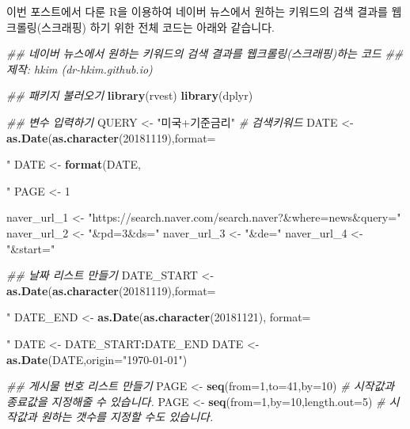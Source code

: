 \documentclass[]{article}
\newenvironment{Shaded}{\begin{snugshade}}{\end{snugshade}}
\newcommand{\CommentTok}[1]{\textcolor[rgb]{0.56,0.35,0.01}{\textit{#1}}}
\newcommand{\DataTypeTok}[1]{\textcolor[rgb]{0.13,0.29,0.53}{#1}}
\newcommand{\DecValTok}[1]{\textcolor[rgb]{0.00,0.00,0.81}{#1}}
\newcommand{\KeywordTok}[1]{\textcolor[rgb]{0.13,0.29,0.53}{\textbf{#1}}}
\newcommand{\NormalTok}[1]{#1}
\newcommand{\OperatorTok}[1]{\textcolor[rgb]{0.81,0.36,0.00}{\textbf{#1}}}
\newcommand{\StringTok}[1]{\textcolor[rgb]{0.31,0.60,0.02}{#1}}
\begin{document}
이번 포스트에서 다룬 R을 이용하여 네이버 뉴스에서 원하는 키워드의 검색
결과를 웹크롤링(스크래핑) 하기 위한 전체 코드는 아래와 같습니다.

\begin{Shaded}
\begin{Highlighting}[]
\CommentTok{## 네이버 뉴스에서 원하는 키워드의 검색 결과를 웹크롤링(스크래핑)하는 코드}
\CommentTok{## 제작: hkim (dr-hkim.github.io)}

\CommentTok{## 패키지 불러오기}
\KeywordTok{library}\NormalTok{(rvest)}
\KeywordTok{library}\NormalTok{(dplyr)}

\CommentTok{## 변수 입력하기}
\NormalTok{QUERY <-}\StringTok{ "미국+기준금리"} \CommentTok{# 검색키워드}
\NormalTok{DATE  <-}\StringTok{ }\KeywordTok{as.Date}\NormalTok{(}\KeywordTok{as.character}\NormalTok{(}\DecValTok{20181119}\NormalTok{),}\DataTypeTok{format=}\StringTok{"%Y%m%d"}\NormalTok{) }\CommentTok{# 검색시작날짜 & 검색종료날짜}
\NormalTok{DATE <-}\StringTok{ }\KeywordTok{format}\NormalTok{(DATE, }\StringTok{"%Y.%m.%d"}\NormalTok{)}
\NormalTok{PAGE  <-}\StringTok{ }\DecValTok{1}

\NormalTok{naver_url_}\DecValTok{1}\NormalTok{ <-}\StringTok{ "https://search.naver.com/search.naver?&where=news&query="}
\NormalTok{naver_url_}\DecValTok{2}\NormalTok{ <-}\StringTok{ "&pd=3&ds="}
\NormalTok{naver_url_}\DecValTok{3}\NormalTok{ <-}\StringTok{ "&de="}
\NormalTok{naver_url_}\DecValTok{4}\NormalTok{ <-}\StringTok{ "&start="}

\CommentTok{## 날짜 리스트 만들기}
\NormalTok{DATE_START <-}\StringTok{ }\KeywordTok{as.Date}\NormalTok{(}\KeywordTok{as.character}\NormalTok{(}\DecValTok{20181119}\NormalTok{),}\DataTypeTok{format=}\StringTok{"%Y%m%d"}\NormalTok{) }\CommentTok{# 시작일자}
\NormalTok{DATE_END   <-}\StringTok{ }\KeywordTok{as.Date}\NormalTok{(}\KeywordTok{as.character}\NormalTok{(}\DecValTok{20181121}\NormalTok{),  }\DataTypeTok{format=}\StringTok{"%Y%m%d"}\NormalTok{) }\CommentTok{# 종료일자}
\NormalTok{DATE <-}\StringTok{ }\NormalTok{DATE_START}\OperatorTok{:}\NormalTok{DATE_END}
\NormalTok{DATE <-}\StringTok{ }\KeywordTok{as.Date}\NormalTok{(DATE,}\DataTypeTok{origin=}\StringTok{"1970-01-01"}\NormalTok{)}

\CommentTok{## 게시물 번호 리스트 만들기}
\NormalTok{PAGE <-}\StringTok{ }\KeywordTok{seq}\NormalTok{(}\DataTypeTok{from=}\DecValTok{1}\NormalTok{,}\DataTypeTok{to=}\DecValTok{41}\NormalTok{,}\DataTypeTok{by=}\DecValTok{10}\NormalTok{) }\CommentTok{# 시작값과 종료값을 지정해줄 수 있습니다.}
\NormalTok{PAGE <-}\StringTok{ }\KeywordTok{seq}\NormalTok{(}\DataTypeTok{from=}\DecValTok{1}\NormalTok{,}\DataTypeTok{by=}\DecValTok{10}\NormalTok{,}\DataTypeTok{length.out=}\DecValTok{5}\NormalTok{) }\CommentTok{# 시작값과 원하는 갯수를 지정할 수도 있습니다.}

}}}}
\end{Highlighting}
\end{Shaded}
\end{document}
